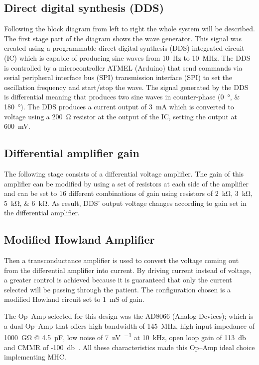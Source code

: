 \subsection{Direct digital synthesis (DDS)}
Following the block diagram from left to right the whole system will be described. The first stage part of the diagram shows the wave generator. This signal was created using a programmable direct digital synthesis (DDS) integrated circuit (IC) which is capable of producing sine waves from \SI{10}{\hertz} to \SI{10}{\mega\hertz}. The DDS is controlled by a microcontroller ATMEL (Arduino) that send commands via serial peripheral interface bus (SPI) transmission interface (SPI) to set the oscillation frequency and start/stop the wave. The signal generated by the DDS is differential meaning that produces two sine waves in counter-phase (\SIlist{0;180}{\degree}). The DDS produces a current output of \SI{3}{\mA} which is converted to voltage using a \SI{200}{\ohm} resistor at the output of the IC, setting the output at \SI{600}{\mV}. 

\subsection{Differential amplifier gain}
The following stage consists of a differential voltage amplifier. The gain of this amplifier can be modified by using a set of resistors at each side of the amplifier and can be set to 16 different combinations of gain using resistors of \SIlist{2;3;5;6}{\kohm}. As result, DDS’ output voltage changes according to gain set in the differential amplifier. 

\subsection{Modified Howland Amplifier}
Then a transconductance amplifier is used to convert the voltage coming out from the differential amplifier into current. By driving current instead of voltage, a greater control is achieved because it is guaranteed that only the current selected will be passing through the patient. The configuration chosen is a modified Howland circuit set to \SI{1}{\milli\siemens} of gain.
 
The Op–Amp  selected for this design was the AD8066 (Analog Devices); which is a dual Op–Amp that offers high bandwidth of \SI{145}{\mega\hertz}, high input impedance of \SI{1000}{\giga\ohm} @ \SI{4.5}{\pF}, low noise of \SI{7}{\nano\volt\per{}} at \SI{10}{\kilo\hertz}, open loop gain of \SI{113}{\decibel} and CMMR of -\SI{100}{\decibel}~\cite{ad:AD8066}. All these characteristics made this Op–Amp ideal choice implementing MHC.

